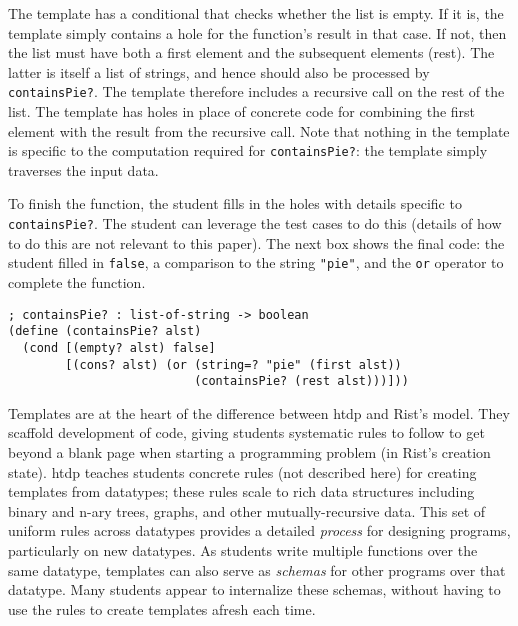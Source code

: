 \documentclass{sig-alternate-05-2015}
\newcommand{\htdp}{{\sc htdp}\xspace}
\begin{document}
\noindent
The template has a conditional that checks whether the list is empty. If it is, the template simply contains a hole for the function's result in that case.  If not, then the list must have both a first element and the subsequent elements (rest).  The latter is itself a list of strings, and hence should also be processed by  \lstinline{containsPie?}.  The template therefore includes a recursive call on the rest of the list.  The template has holes in place of concrete code for combining the first element with the result from the recursive call. Note that nothing in the template is specific to the computation required for \lstinline{containsPie?}: the template simply traverses the input data.

To finish the function, the student fills in the holes with details specific to \lstinline{containsPie?}.  The student can leverage the test cases to do this (details of how to do this are not relevant to this paper).  The next box shows the final code: the student filled in \lstinline{false}, a comparison to the string \lstinline{"pie"}, and the \lstinline{or} operator to complete the function.

\noindent
\begin{minipage}{\linewidth}
\begin{lstlisting}
; containsPie? : list-of-string -> boolean
(define (containsPie? alst)
  (cond [(empty? alst) false]
        [(cons? alst) (or (string=? "pie" (first alst)) 
                          (containsPie? (rest alst)))]))
\end{lstlisting}
\label{template-example}
\end{minipage}

Templates are at the heart of the difference between \htdp and Rist's model. They scaffold development of code, giving students systematic rules to follow to get beyond a blank page when starting a programming problem (in Rist's creation state). \htdp teaches students concrete rules (not described here) for creating templates from datatypes; these rules scale to rich data structures including binary and n-ary trees, graphs, and other mutually-recursive data.  This set of uniform rules across datatypes provides a detailed \emph{process} for designing programs, particularly on new datatypes.  As students write multiple functions over the same datatype, templates can also serve as \emph{schemas} for other programs over that datatype.  Many students appear to internalize these schemas, without having to use the rules to create templates afresh each time.  
\end{document}

